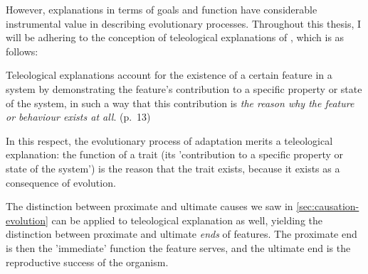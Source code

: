 However, explanations in terms of goals and function have considerable instrumental value in describing evolutionary processes. Throughout this thesis, I will be adhering to the conception of teleological explanations of \citet{Ayala99}, which is as follows:
\begin{quoting}
    Teleological explanations account for the existence of a certain feature in a system by demonstrating the feature’s contribution to a specific property or state of the system, in such a way that this contribution is \emph{the reason why the feature or behaviour exists at all}.
    \hfill (p.~13)
\end{quoting}
In this respect, the evolutionary process of adaptation merits a teleological explanation: the function of a trait (its 'contribution to a specific property or state of the system') is the reason that the trait exists, because it exists as a consequence of evolution.

The distinction between proximate and ultimate causes we saw in \cref{sec:causation-evolution} can be applied to teleological explanation as well, yielding the distinction between proximate and ultimate \emph{ends} of features. The proximate end is then the 'immediate' function the feature serves, and the ultimate end is the reproductive success of the organism.


